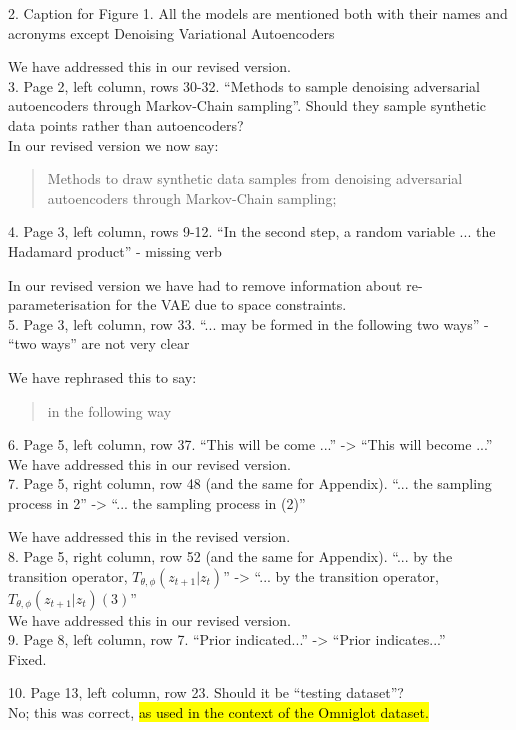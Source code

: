 \documentclass[a4paper,11pt]{article}
\begin{document}
{\color{blue}
2. Caption for Figure 1. All the models are mentioned both with their names and acronyms except Denoising Variational Autoencoders
}

We have addressed this in our revised version.\\

{\color{blue}
3. Page 2, left column, rows 30-32. ``Methods to sample denoising adversarial autoencoders through Markov-Chain sampling''. Should they sample synthetic data points rather than autoencoders?
}\\

In our revised version we now say:
\begin{quote}
{\color{red}Methods to draw synthetic data samples from denoising adversarial autoencoders through Markov-Chain sampling;}
\end{quote}

{\color{blue}
4. Page 3, left column, rows 9-12. ``In the second step, a random variable ... the Hadamard product'' - missing verb
}

In our revised version we have had to remove information about  re-parameterisation for the VAE due to space constraints.\\

{\color{blue}
5. Page 3, left column, row 33. ``... may be formed in the following two ways'' - ``two ways'' are not very clear\\
}

We have rephrased this to say:

\begin{quote}
{\color{red} in the following way}
\end{quote}

{\color{blue}
6. Page 5, left column, row 37. ``This will be come ...'' -> ``This will become ...''
}\\

We have addressed this in our revised version.\\

{\color{blue}
7. Page 5, right column, row 48 (and the same for Appendix). ``... the sampling process in 2'' -> ``... the sampling process in (2)''\\
}

We have addressed this in the revised version.\\

{\color{blue} 8. Page 5, right column, row 52 (and the same for Appendix). ``... by the transition operator, $T_{\theta, \phi}(z_{t+1}|z_t)$'' -> ``... by the transition operator, $T_{\theta, \phi}(z_{t+1}|z_t) (3)$''}\\

We have addressed this in our revised version.\\

{\color{blue} 9. Page 8, left column, row 7. ``Prior indicated...'' -> ``Prior indicates...''}\\

Fixed.

{\color{blue} 10. Page 13, left column, row 23. Should it be ``testing dataset''?}\\

No; this was correct, \hl{as used in the context of the Omniglot dataset.}\\
\end{document}
